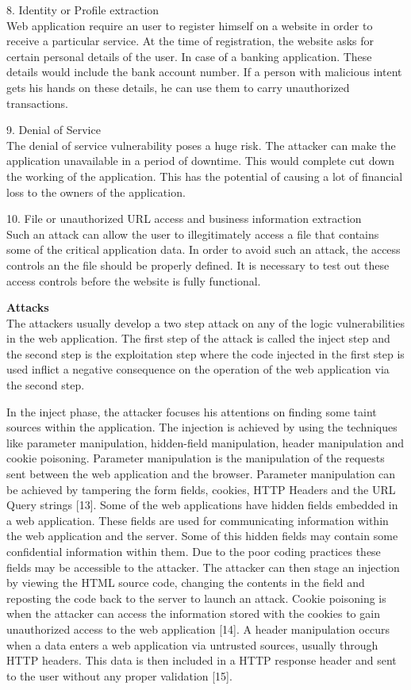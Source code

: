 \documentclass[11pt]{article}
\begin{document}
8. Identity or Profile extraction\\
 Web application require an user to register himself on a website in order to receive a particular service. At the time of registration, the website asks for certain personal details of the user. In case of a banking application. These details would include the bank account number. If a person with malicious intent gets his hands on these details, he can use them to carry unauthorized transactions.
 
 9. Denial of Service\\
 The denial of service vulnerability poses a huge risk. The attacker can make the application unavailable in a period of downtime. This would complete cut down the working of the application. This has the potential of causing a lot of financial loss to the owners of the application. 
 
10. File or unauthorized URL access and business information extraction\\
Such an attack can allow the user to illegitimately access a file that contains some of the critical application data. In order to avoid such an attack, the access controls an the file should be properly defined. It is necessary to test out these access controls before the website is fully functional.

\textbf{Attacks}\\
The attackers usually develop a two step attack on any of the logic vulnerabilities in the web application. The first step of the attack is called the inject step and the second step is the exploitation step where the code injected in the first step is used inflict a negative consequence on the operation of the web application via the second step.
 
 In the inject phase, the attacker focuses his attentions on finding some taint sources within the application. The injection is achieved by using the techniques like parameter manipulation, hidden-field manipulation, header manipulation and cookie poisoning. Parameter manipulation is the manipulation of the requests sent between the web application and the browser. Parameter manipulation can be achieved by tampering the form fields, cookies, HTTP Headers and the URL Query strings [13]. Some of the web applications have hidden fields embedded in a web application. These fields are used for communicating information within the web application and the server. Some of this hidden fields may contain some confidential information within them. Due to the poor coding practices these fields may be accessible to the attacker. The attacker can then stage an injection by viewing the HTML source code, changing the contents in the field and reposting the code back to the server to launch an attack. Cookie poisoning is when the attacker can access the information stored with the cookies to gain unauthorized access to the web application [14].  A header manipulation occurs when a data enters a web application via untrusted sources, usually through HTTP headers. This data is then included in a HTTP response header and sent to the user without any proper validation [15].
 
\end{document}
